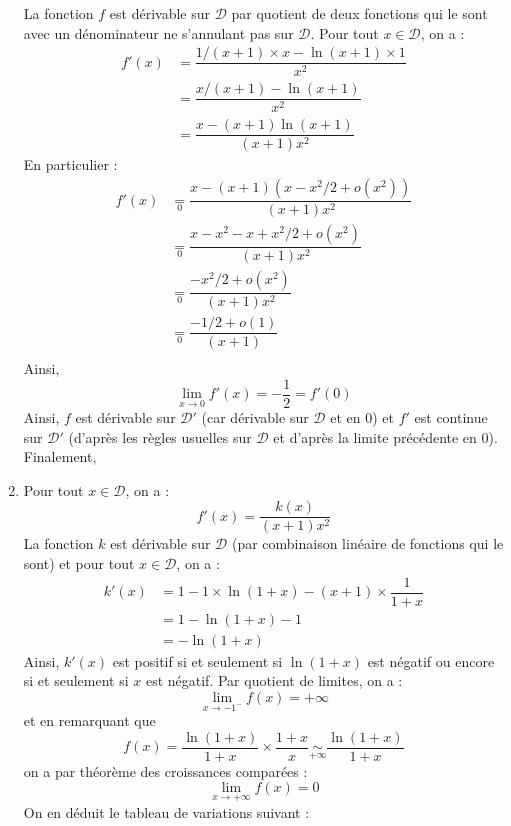 \documentclass[a4paper,twoside,french,10pt]{VcCours}
\begin{document}
\begin{enumerate}
La fonction $f$ est dérivable sur $\mathcal{D}$ par quotient de deux fonctions qui le sont avec un dénominateur ne s'annulant pas sur $\mathcal{D}$. Pour tout $x \in \mathcal{D}$, on a :
\begin{align*}
f'(x) & = \dfrac{1/(x+1) \times x - \ln(x+1) \times 1}{x^2} \\
& = \dfrac{x/(x+1)- \ln(x+1)}{x^2} \\
& = \dfrac{x-(x+1)\ln(x+1)}{(x+1)x^2}
\end{align*}
En particulier :
\begin{align*}
f'(x)&  \underset{0}{=} \dfrac{x-(x+1)(x-x^2/2+o(x^2))}{(x+1)x^2} \\
&  \underset{0}{=}\dfrac{x-x^2-x+x^2/2+o(x^2)}{(x+1)x^2} \\
& \underset{0}{=}\dfrac{-x^2/2+o(x^2)}{(x+1)x^2} \\
& \underset{0}{=}\dfrac{-1/2+o(1)}{(x+1)} \\
\end{align*}
Ainsi,
$$ \lim_{x \rightarrow 0} f'(x) = - \dfrac{1}{2}= f'(0)$$
Ainsi, $f$ est dérivable sur $\mathcal{D}'$ (car dérivable sur $\mathcal{D}$ et en $0$) et $f'$ est continue sur $\mathcal{D}'$ (d'après les règles usuelles sur $\mathcal{D}$ et d'après la limite précédente en $0$). Finalement,

\item Pour tout $x \in \mathcal{D}$, on a :
$$ f'(x) = \dfrac{k(x)}{(x+1)x^2}$$
La fonction $k$ est dérivable sur $\mathcal{D}$ (par combinaison linéaire de fonctions qui le sont) et pour tout $x \in \mathcal{D}$, on a :
\begin{align*}
k'(x) & = 1 - 1 \times \ln(1+x)-(x+1) \times \dfrac{1}{1+x} \\
& = 1 - \ln(1+x) - 1 \\
& = - \ln(1+x)
\end{align*}
Ainsi, $k'(x)$ est positif si et seulement si $\ln(1+x)$ est négatif ou encore si et seulement si $x$ est négatif. Par quotient de limites, on a :
$$ \lim_{x \rightarrow -1^{-}} f(x)= + \infty$$
et en remarquant que 
$$ f(x) = \dfrac{\ln(1+x)}{1+x} \times \dfrac{1+x}{x} \underset{+ \infty}{\sim} \dfrac{\ln(1+x)}{1+x}$$
on a par théorème des croissances comparées :
$$ \lim_{x \rightarrow + \infty} f(x) = 0$$
On en déduit le tableau de variations suivant :

\begin{center}
\end{center}
\end{enumerate}
\end{document}
